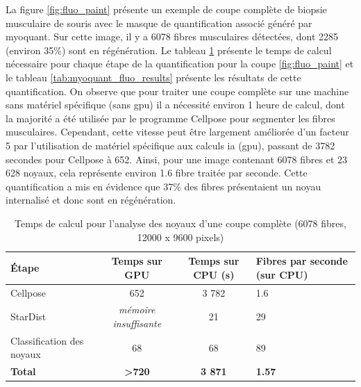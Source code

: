 La figure \ref{fig:fluo_paint} présente un exemple de coupe complète de biopsie musculaire de souris avec le masque de quantification associé généré par \gls{myoquant}. Sur cette image, il y a 6078 fibres musculaires détectées, dont 2285 (environ 35\%) sont en régénération. Le tableau \ref{tab:myoquant_fluo_time} présente le temps de calcul nécessaire pour chaque étape de la quantification pour la coupe \ref{fig:fluo_paint} et le tableau \ref{tab:myoquant_fluo_results} présente les résultats de cette quantification. On observe que pour traiter une coupe complète sur une machine sans matériel spécifique (sans \gls{gpu}) il a nécessité environ 1 heure de calcul, dont la majorité a été utilisée par le programme Cellpose pour segmenter les fibres musculaires. Cependant, cette vitesse peut être largement améliorée d'un facteur 5 par l'utilisation de matériel spécifique aux calculs \gls{ia} (\gls{gpu}), passant de 3782 secondes pour Cellpose à 652. Ainsi, pour une image contenant 6078 fibres et 23 628 noyaux, cela représente environ 1.6 fibre traitée par seconde. Cette quantification a mis en évidence que 37\% des fibres présentaient un noyau internalisé et donc sont en régénération.
\begin{table}[!ht]
\centering
\caption{Temps de calcul pour l'analyse des noyaux d'une coupe complète (6078 fibres, 12000 x 9600 pixels)}
\label{tab:myoquant_fluo_time}
\begin{tabularx}{\textwidth}{|l|c|c|X|}
\hline
\textbf{Étape} & \textbf{Temps sur GPU} & \textbf{Temps sur CPU (s)} & \textbf{Fibres par seconde (sur CPU)} \\
\hline
Cellpose & 652 & 3 782 & 1.6 \\
\hline
StarDist & \textit{mémoire insuffisante} & 21 & 29 \\
\hline
Classification des noyaux & 68 & 68 & 89 \\
\hline
\textbf{Total} & \textbf{>720} & \textbf{3 871} & \textbf{1.57} \\
\hline
\end{tabularx}
\end{table}


